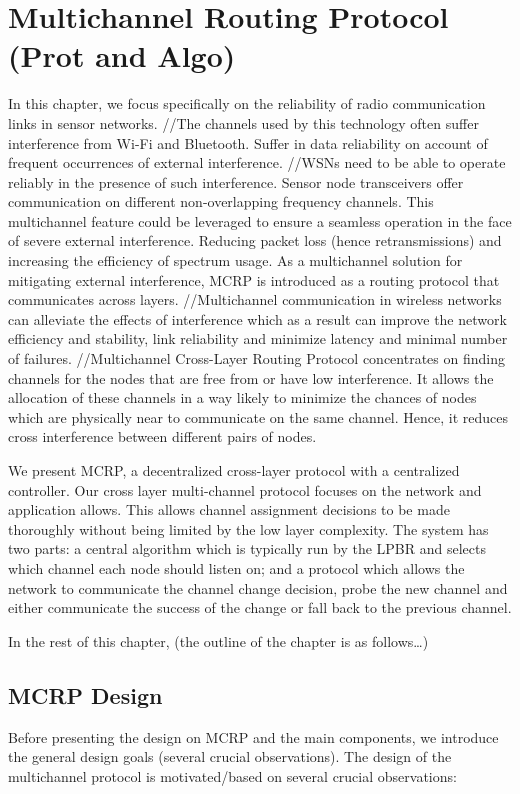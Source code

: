 \chapter{Multichannel Routing Protocol (Prot and Algo)}
\label{MCRP}

In this chapter, we focus specifically on the reliability of radio communication links in sensor networks.
//The channels used by this technology often suffer interference from Wi-Fi and Bluetooth. 
Suffer in data reliability on account of frequent occurrences of external interference.
//WSNs need to be able to operate reliably in the presence of such interference.
Sensor node transceivers offer communication on different non-overlapping frequency channels. This multichannel feature could be leveraged to ensure a seamless operation in the face of severe external interference. Reducing packet loss (hence retransmissions) and increasing the efficiency of spectrum usage.
As a multichannel solution for mitigating external interference, MCRP is introduced as a routing protocol that communicates across layers. 
//Multichannel communication in wireless networks can alleviate the effects of interference which as a result can improve the network efficiency and stability, link reliability and minimize latency and minimal number of failures.
//Multichannel Cross-Layer Routing Protocol concentrates on finding channels for the nodes that are free from or have low interference. It allows the allocation of these channels in a way likely to minimize the chances of nodes which are physically near to communicate on the same channel. Hence, it reduces cross interference between different pairs of nodes.

We present MCRP, a decentralized cross-layer protocol with a centralized controller. Our cross layer multi-channel protocol focuses on the network and application allows. This allows channel assignment decisions to be made thoroughly without being limited by the low layer complexity. The system has two parts: a central algorithm which is typically run by the LPBR and selects which channel each node should listen on; and a protocol which allows the network to communicate the channel change decision, probe the new channel and either communicate the success of the change or fall back to the previous channel.

In the rest of this chapter, (the outline of the chapter is as follows…)

\section{MCRP Design}
Before presenting the design on MCRP and the main components, we introduce the general design goals (several crucial observations). The design of the multichannel protocol is motivated/based on several crucial observations: 

